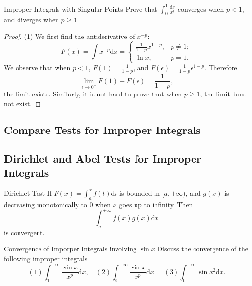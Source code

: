 \begin{example}{Improper Integrals with Singular Points}{}
  Prove that $\int_0^1 \frac{\mathrm{d} x}{x^p}$ converges when $p < 1$,
  and diverges when $p \geq 1$.
\end{example}

\begin{proof}
  (1) We first find the antiderivative of $x^{-p}$:
  \begin{equation}
    F(x) = \int x^{-p}\mathrm{d} x =
    \begin{cases}
      \frac{1}{1-p} x^{1-p}, & p \neq 1;\\
      \ln x, & p =1.
    \end{cases}
  \end{equation}
  We observe that when $p < 1$, $F(1) = \frac{1}{1-p}$, and $F(\epsilon) =
  \frac{1}{1-p} \epsilon^{1-p}$. Therefore
  \begin{equation}
    \lim \limits _{\epsilon \rightarrow 0^+} F(1) - F(\epsilon) = \frac{1}{1-p},
  \end{equation}
  the limit exists. Similarly, it is not hard to prove that when $p \geq 1$, the
  limit does not exist.
\end{proof}

\subsection{Compare Tests for Improper Integrals}


\subsection{Dirichlet and Abel Tests for Improper Integrals}

\begin{theorem}{Dirichlet Test}{}
  If $F(x) = \int_a^x f(t)\mathrm{d} t$ is bounded in $[a, +\infty)$,
  and $g(x)$ is decreasing monotonically to $0$ when $x$ goes up to infinity.
  Then
  \begin{equation}
    \int_a^{+\infty} f(x)g(x)\mathrm{d}x
  \end{equation}
  is convergent.
\end{theorem}

\begin{example}{Convergence of Imporper Integrals involving $\sin x$}{}
  Discuss the convergence of the following improper integrals
  \begin{equation}
    (1) \int_1^{+\infty} \frac{\sin x}{x^p}\mathrm{d}x, \quad
    (2) \int_0^{+\infty} \frac{\sin x}{x^p} \mathrm{d} x, \quad
    (3) \int_0^{+\infty} \sin x^2 \mathrm{d} x.
  \end{equation}
\end{example}

